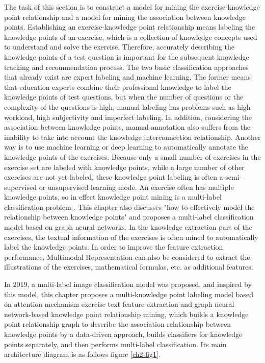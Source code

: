 The task of this section is to construct a model for mining the exercise-knowledge point relationship and a model for mining the association between knowledge points. Establishing an exercise-knowledge point relationship means labeling the knowledge points of an exercise, which is a collection of knowledge concepts used to understand and solve the exercise. Therefore, accurately describing the knowledge points of a test question is important for the subsequent knowledge tracking and recommendation process. The two basic classification approaches that already exist are expert labeling and machine learning. The former means that education experts combine their professional knowledge to label the knowledge points of test questions, but when the number of questions or the complexity of the questions is high, manual labeling has problems such as high workload, high subjectivity and imperfect labeling. In addition, considering the association between knowledge points, manual annotation also suffers from the inability to take into account the knowledge interconnection relationship. Another way is to use machine learning or deep learning to automatically annotate the knowledge points of the exercises. Because only a small number of exercises in the exercise set are labeled with knowledge points, while a large number of other exercises are not yet labeled, these knowledge point labeling is often a semi-supervised or unsupervised learning mode. An exercise often has multiple knowledge points, so in effect knowledge point mining is a multi-label classification problem \cite{tsoumakas2007multi,zhang2013review,liu2020emerging}. This chapter also discusses "how to effectively model the relationship between knowledge points" and proposes a multi-label classification model based on graph neural networks. In the knowledge extraction part of the exercises, the textual information of the exercises is often mined to automatically label the knowledge points. In order to improve the feature extraction performance, Multimodal Representation \cite{guo2019deep} can also be considered to extract the illustrations of the exercises, mathematical formulas, etc. as additional features.

In 2019, a multi-label image classification model was proposed\cite{chen2019multi}, and inspired by this model, this chapter proposes a multi-knowledge point labeling model based on attention mechanism exercise text feature extraction and graph neural network-based knowledge point relationship mining, which builds a knowledge point relationship graph to describe the association relationship between knowledge points by a data-driven approach, builds classifiers for knowledge points separately, and then performs multi-label classification. Its main architecture diagram is as follows figure \ref{ch2-fig1}.

